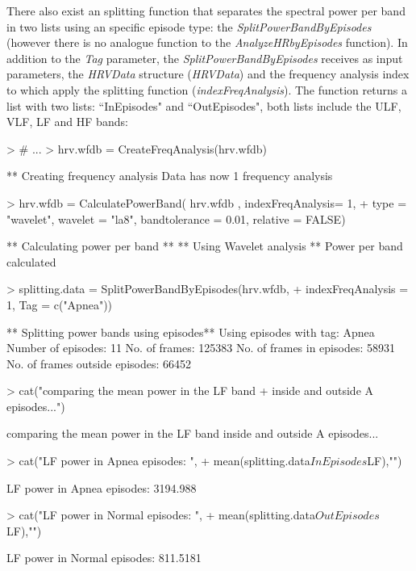 \documentclass[12pt,lot, lof]{puthesis}
\begin{document}
There also exist an splitting function that separates the spectral power per 
band in two lists using an specific episode type: the 
\textit{SplitPowerBandByEpisodes} (however there is no analogue function to the 
\textit{AnalyzeHRbyEpisodes} function). In addition to the \textit{Tag} 
parameter, the \textit{SplitPowerBandByEpisodes} receives as input parameters, 
the \textit{HRVData} structure (\textit{HRVData}) and the frequency analysis 
index to which apply the splitting function (\textit{indexFreqAnalysis}). The 
function returns a list with two lists: ``InEpisodes" and ``OutEpisodes", both 
lists include the \gls{ULF}, \gls{VLF}, \gls{LF} and \gls{HF} bands:
\begin{Schunk}
\begin{Sinput}
> # ...
> hrv.wfdb = CreateFreqAnalysis(hrv.wfdb)
\end{Sinput}
\begin{Soutput}
** Creating frequency analysis
   Data has now 1 frequency analysis
\end{Soutput}
\begin{Sinput}
> hrv.wfdb = CalculatePowerBand( hrv.wfdb , indexFreqAnalysis= 1,
+  type = "wavelet", wavelet = "la8", bandtolerance = 0.01, relative = FALSE)
\end{Sinput}
\begin{Soutput}
** Calculating power per band **
** Using Wavelet analysis **
Power per band calculated
\end{Soutput}
\begin{Sinput}
> splitting.data = SplitPowerBandByEpisodes(hrv.wfdb, 
+ indexFreqAnalysis = 1, Tag = c("Apnea"))
\end{Sinput}
\begin{Soutput}
** Splitting power bands using episodes**
   Using episodes with tag: Apnea 
   Number of episodes: 11 
   No. of frames: 125383 
   No. of frames in episodes: 58931 
   No. of frames outside episodes: 66452 
\end{Soutput}
\begin{Sinput}
> cat("comparing the mean power in the LF band
+  inside and outside A episodes...\n")
\end{Sinput}
\begin{Soutput}
comparing the mean power in the LF band
 inside and outside A episodes...
\end{Soutput}
\begin{Sinput}
> cat("LF power in Apnea episodes: ",
+ mean(splitting.data$InEpisodes$LF),"\n")
\end{Sinput}
\begin{Soutput}
LF power in Apnea episodes:  3194.988 
\end{Soutput}
\begin{Sinput}
> cat("LF power in Normal episodes: ",
+ mean(splitting.data$OutEpisodes$LF),"\n")
\end{Sinput}
\begin{Soutput}
LF power in Normal episodes:  811.5181 
\end{Soutput}
\end{Schunk}
\end{document}
